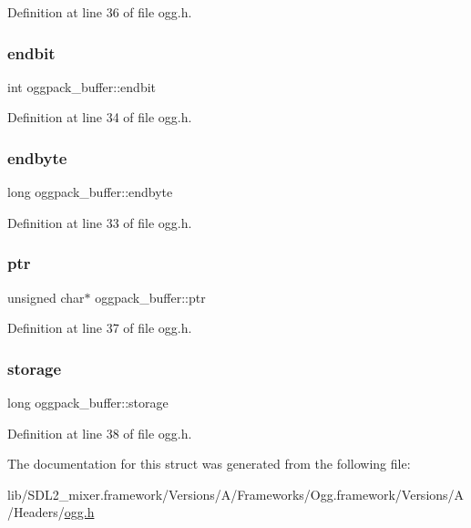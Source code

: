 Definition at line 36 of file ogg.\+h.

\mbox{\label{structoggpack__buffer_a5a2ecb260025f73201e58dbd621c9f8b}} 
\subsubsection{\texorpdfstring{endbit}{endbit}}
{\footnotesize\ttfamily int oggpack\+\_\+buffer\+::endbit}



Definition at line 34 of file ogg.\+h.

\mbox{\label{structoggpack__buffer_a416200dd77da3603dce3913826d74207}} 
\subsubsection{\texorpdfstring{endbyte}{endbyte}}
{\footnotesize\ttfamily long oggpack\+\_\+buffer\+::endbyte}



Definition at line 33 of file ogg.\+h.

\mbox{\label{structoggpack__buffer_a479984d9646e0fba6da8aff21e5c3b64}} 
\subsubsection{\texorpdfstring{ptr}{ptr}}
{\footnotesize\ttfamily unsigned char$\ast$ oggpack\+\_\+buffer\+::ptr}



Definition at line 37 of file ogg.\+h.

\mbox{\label{structoggpack__buffer_a1eea2afb662c8080a902d224773fee4e}} 
\subsubsection{\texorpdfstring{storage}{storage}}
{\footnotesize\ttfamily long oggpack\+\_\+buffer\+::storage}



Definition at line 38 of file ogg.\+h.



The documentation for this struct was generated from the following file\+:\begin{DoxyCompactItemize}
\item 
lib/\+S\+D\+L2\+\_\+mixer.\+framework/\+Versions/\+A/\+Frameworks/\+Ogg.\+framework/\+Versions/\+A/\+Headers/\mbox{\hyperlink{ogg_8h}{ogg.\+h}}\end{DoxyCompactItemize}
